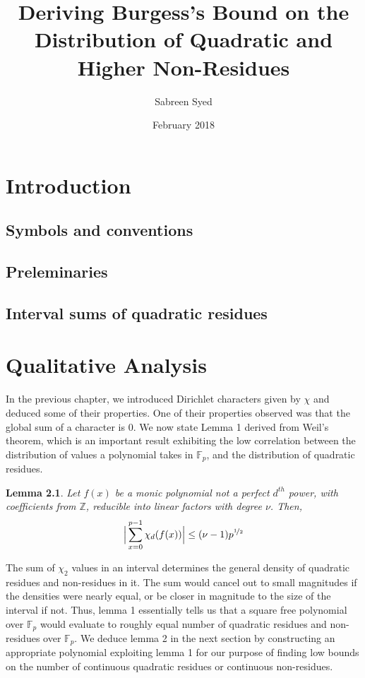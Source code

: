 \documentclass{report}
\title{Deriving Burgess's Bound on the Distribution of Quadratic and Higher Non-Residues}
\author{
  Sabreen Syed\\
  \multicolumn{1}{p{.7\textwidth}}{\centering\emph{Department of Computer Science and Engineering\\
  Indian Institute of Technology Kanpur, India}}}
\date{February 2018}
\newtheorem{lemma}{Lemma}
\begin{document}
\maketitle

\chapter{Introduction}
%
\section{Symbols and conventions}
%
\section{Preleminaries}
%
\section{Interval sums of quadratic residues}
%
%
\chapter{Qualitative Analysis}
In the previous chapter, we introduced Dirichlet characters given by $\chi$ and deduced some of their properties. One of their properties observed was that the global sum of a character is 0.  We now state Lemma 1 derived from Weil's theorem, which is an important result exhibiting the low correlation between the distribution of values a polynomial takes in $\mathbb{F}_p$, and the distribution of quadratic residues.
%
\begin{lemma}
\cite{burgess}Let $f(x)$ be a monic polynomial not a perfect $d^{th}$ power, with coefficients from $\mathbb{Z}$, reducible into linear factors with degree $\nu$. Then,
$$\Big\lvert\sum\limits_{x=0}^{p-1}\chi_d(f(x))\Big\rvert\leq (\nu -1)p^{\nicefrac{1}{2}}$$
\end{lemma}
%
The sum of $\chi_2$ values in an interval determines the general density of quadratic residues and non-residues in it. The sum would cancel out to small magnitudes if the densities were nearly equal, or be closer in magnitude to the size of the interval if not. Thus, lemma 1 essentially tells us that a square free polynomial over $\mathbb{F}_p$ would evaluate to roughly equal number of quadratic residues and non-residues over $\mathbb{F}_p$. We deduce lemma 2 in the next section by constructing an appropriate polynomial exploiting lemma 1 for our purpose of finding low bounds on the number of continuous quadratic residues or continuous non-residues.
%
\end{document}
